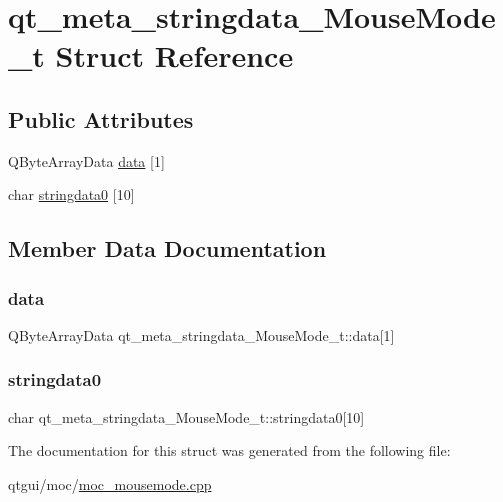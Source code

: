 \hypertarget{structqt__meta__stringdata___mouse_mode__t}{}\section{qt\+\_\+meta\+\_\+stringdata\+\_\+\+Mouse\+Mode\+\_\+t Struct Reference}
\label{structqt__meta__stringdata___mouse_mode__t}
\subsection*{Public Attributes}
\begin{DoxyCompactItemize}
\item 
Q\+Byte\+Array\+Data \mbox{\hyperlink{structqt__meta__stringdata___mouse_mode__t_af60ec0d47b82be31e7e11a9c9f2843a0}{data}} \mbox{[}1\mbox{]}
\item 
char \mbox{\hyperlink{structqt__meta__stringdata___mouse_mode__t_a3527aad20d27361c4b9347629846250d}{stringdata0}} \mbox{[}10\mbox{]}
\end{DoxyCompactItemize}


\subsection{Member Data Documentation}
\mbox{\label{structqt__meta__stringdata___mouse_mode__t_af60ec0d47b82be31e7e11a9c9f2843a0}} 
\subsubsection{\texorpdfstring{data}{data}}
{\footnotesize\ttfamily Q\+Byte\+Array\+Data qt\+\_\+meta\+\_\+stringdata\+\_\+\+Mouse\+Mode\+\_\+t\+::data\mbox{[}1\mbox{]}}

\mbox{\label{structqt__meta__stringdata___mouse_mode__t_a3527aad20d27361c4b9347629846250d}} 
\subsubsection{\texorpdfstring{stringdata0}{stringdata0}}
{\footnotesize\ttfamily char qt\+\_\+meta\+\_\+stringdata\+\_\+\+Mouse\+Mode\+\_\+t\+::stringdata0\mbox{[}10\mbox{]}}



The documentation for this struct was generated from the following file\+:\begin{DoxyCompactItemize}
\item 
qtgui/moc/\mbox{\hyperlink{moc__mousemode_8cpp}{moc\+\_\+mousemode.\+cpp}}\end{DoxyCompactItemize}
